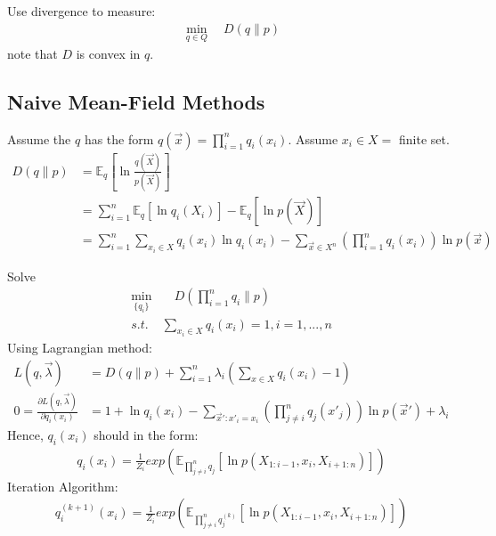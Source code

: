 \documentclass[11pt,a4paper]{article}
\begin{document}
Use divergence to measure:
\begin{equation}
    \begin{aligned}
        \min_{q\in Q}\quad D(q\| p)
    \end{aligned}
    \nonumber
\end{equation}
note that $D$ is convex in $q$.

\subsection{Naive Mean-Field Methods}
Assume the $q$ has the form $q(\vec{x})=\prod_{i=1}^nq_i (x_i)$. Assume $x_i\in X=$ finite set.
\begin{equation}
    \begin{aligned}
        D(q\| p)&=\mathbb{E}_q\left[\ln\frac{q(\vec{X})}{p(\vec{X})}\right]\\
        &=\sum_{i=1}^n \mathbb{E}_{q}\left[\ln q_i(X_i)\right]- \mathbb{E}_q\left[\ln p(\vec{X})\right]\\
        &=\sum_{i=1}^n\sum_{x_i\in X}q_i(x_i)\ln q_i(x_i)-\sum_{\vec{x}\in X^n}\left(\prod_{i=1}^nq_i (x_i)\right)\ln p(\vec{x})
    \end{aligned}
    \nonumber
\end{equation}

Solve 
\begin{equation}
    \begin{aligned}
        \min_{\{q_i\}}&\quad D(\prod_{i=1}^nq_i\| p)\\
        s.t.&\sum_{x_i\in X}q_i(x_i)=1,i=1,...,n
    \end{aligned}
    \nonumber
\end{equation}
Using Lagrangian method:
\begin{equation}
    \begin{aligned}
        L(q,\vec{\lambda})&=D(q\| p)+\sum_{i=1}^n\lambda_i\left(\sum_{x\in X}q_i(x_i)-1\right)\\
        0=\frac{\partial L(q,\vec{\lambda})}{\partial q_i(x_i)}&=1+\ln q_i(x_i)-\sum_{\vec{x}':x'_i=x_i}\left(\prod_{j\neq i}^nq_j (x'_j)\right)\ln p(\vec{x}')+\lambda_i
    \end{aligned}
    \nonumber
\end{equation}
Hence, $q_i(x_i)$ should in the form:
\begin{equation}
    \begin{aligned}
        q_i(x_i)=\frac{1}{Z_i}exp\left({\mathbb{E}_{\prod_{j\neq i}^nq_j}[\ln p(X_{1:i-1},x_i,X_{i+1:n})]}\right)
    \end{aligned}
    \nonumber
\end{equation}
Iteration Algorithm:
\begin{equation}
    \begin{aligned}
        q_i^{(k+1)}(x_i)=\frac{1}{Z_i}exp\left({\mathbb{E}_{\prod_{j\neq i}^nq_j^{(k)}}[\ln p(X_{1:i-1},x_i,X_{i+1:n})]}\right)
    \end{aligned}
    \nonumber
\end{equation}
\end{document}
